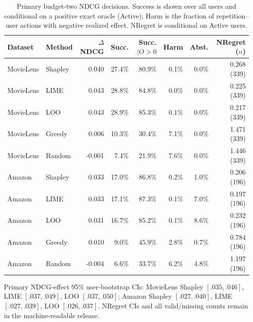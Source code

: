 \begin{table}[t]\centering\scriptsize
\setlength{\tabcolsep}{1.5pt}
\caption{Primary budget-two NDCG decisions. Success is shown over all users and conditional on a positive exact oracle (Active); Harm is the fraction of repetition--user actions with negative realized effect. NRegret is conditional on Active users.}
\label{tab:intervention-outcomes}
\begin{tabular}{llrrrrrr}
\toprule
Dataset & Method & $\Delta$NDCG & Succ. & Succ.$\mid O>0$ & Harm & Abst. & NRegret ($n$) \\
\midrule
MovieLens & Shapley & 0.040 & 27.4\% & 80.9\% & 0.1\% & 0.0\% & 0.268 (339) \\
MovieLens & LIME & 0.043 & 28.8\% & 84.8\% & 0.0\% & 0.0\% & 0.225 (339) \\
MovieLens & LOO & 0.043 & 28.9\% & 85.3\% & 0.1\% & 0.0\% & 0.217 (339) \\
MovieLens & Greedy & 0.006 & 10.3\% & 30.4\% & 7.1\% & 0.0\% & 1.471 (339) \\
MovieLens & Random & -0.001 & 7.4\% & 21.9\% & 7.6\% & 0.0\% & 1.446 (339) \\
\midrule
Amazon & Shapley & 0.033 & 17.0\% & 86.8\% & 0.2\% & 1.0\% & 0.206 (196) \\
Amazon & LIME & 0.033 & 17.1\% & 87.3\% & 0.1\% & 7.0\% & 0.197 (196) \\
Amazon & LOO & 0.031 & 16.7\% & 85.2\% & 0.1\% & 8.6\% & 0.232 (196) \\
Amazon & Greedy & 0.010 & 9.0\% & 45.9\% & 2.8\% & 0.7\% & 0.784 (196) \\
Amazon & Random & -0.004 & 6.6\% & 33.7\% & 6.2\% & 4.8\% & 1.197 (196) \\
\bottomrule
\end{tabular}
\end{table}

\noindent\scriptsize Primary NDCG-effect 95\% user-bootstrap CIs: MovieLens Shapley $[.035,.046]$, LIME $[.037,.049]$, LOO $[.037,.050]$; Amazon Shapley $[.027,.040]$, LIME $[.027,.039]$, LOO $[.026,.037]$. NRegret CIs and all valid/missing counts remain in the machine-readable release.
